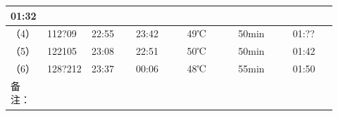 \documentclass[UTF8,10pt,a4paper,fontset=fandol]{ctexart}
\newcommand{\fieldvalue}[1]{#1}
\newcommand{\handwritten}[1]{#1}
\begin{document}
\begin{tabular}{|p{0.07\linewidth}|p{0.13\linewidth}|p{0.13\linewidth}|p{0.15\linewidth}|p{0.15\linewidth}|p{0.16\linewidth}|p{0.13\linewidth}|}
\fieldvalue{\handwritten{01:32}}
\\ \hline
（4） &
\fieldvalue{\handwritten{112?09}} &
\fieldvalue{\handwritten{22:55}} &
\fieldvalue{\handwritten{23:42}} &
\fieldvalue{\handwritten{49℃}} &
\fieldvalue{\handwritten{50min}} &
\fieldvalue{\handwritten{01:??}}
\\ \hline
（5） &
\fieldvalue{\handwritten{122105}} &
\fieldvalue{\handwritten{23:08}} &
\fieldvalue{\handwritten{22:51}} &
\fieldvalue{\handwritten{50℃}} &
\fieldvalue{\handwritten{50min}} &
\fieldvalue{\handwritten{01:42}}
\\ \hline
（6） &
\fieldvalue{\handwritten{128?212}} &
\fieldvalue{\handwritten{23:37}} &
\fieldvalue{\handwritten{00:06}} &
\fieldvalue{\handwritten{48℃}} &
\fieldvalue{\handwritten{55min}} &
\fieldvalue{\handwritten{01:50}}
\\ \hline
\multicolumn{1}{|p{0.07\linewidth}|}{备注：} &

\end{tabular}
\end{document}
